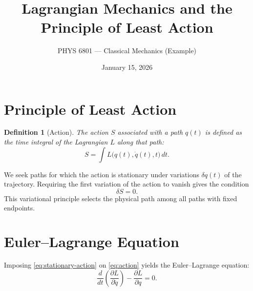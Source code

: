 \documentclass[11pt]{article}
\title{Lagrangian Mechanics and the Principle of Least Action}
\author{PHYS 6801 --- Classical Mechanics (Example)}
\date{January 15, 2026}
\newtheorem{definition}{Definition}
\begin{document}
\maketitle

\section{Principle of Least Action}

\begin{definition}[Action]
The \emph{action} $S$ associated with a path $q(t)$ is defined as the time integral of the
Lagrangian $L$ along that path:
\begin{equation}
  S = \int L\bigl(q(t), \dot{q}(t), t\bigr)\, dt.
  \label{eq:action}
\end{equation}
\end{definition}

We seek paths for which the action is stationary under variations $\delta q(t)$ of the trajectory.
Requiring the first variation of the action to vanish gives the condition
\begin{equation}
  \delta S = 0.
  \label{eq:stationary-action}
\end{equation}
This variational principle selects the physical path among all paths with fixed endpoints.

\section{Euler--Lagrange Equation}

Imposing \eqref{eq:stationary-action} on \eqref{eq:action} yields the Euler--Lagrange equation:
\begin{equation}
  \frac{d}{dt}\left(\frac{\partial L}{\partial \dot{q}}\right)
  - \frac{\partial L}{\partial q} = 0.
  \label{eq:euler-lagrange}
\end{equation}
\end{document}
